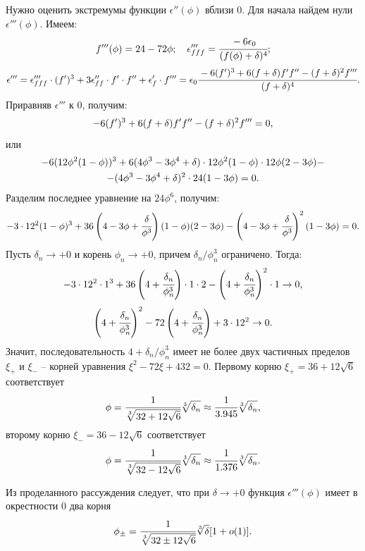 Нужно оценить экстремумы функции $\epsilon''(\phi)$ вблизи $0$. Для начала найдем нули $\epsilon'''(\phi)$. Имеем:
$$f'''(\phi) = 24 - 72 \phi; \quad \epsilon'''_{fff} = \cfrac{-6 \epsilon_0}{(f(\phi) + \delta)^4} {\text{;}}$$
\begin{equation}
    \epsilon''' = \epsilon'''_{fff} \cdot (f')^3 + 3 \epsilon''_{ff} \cdot f' \cdot f'' + \epsilon'_f \cdot f''' = \epsilon_0 \cfrac{-6 (f')^3 + 6 (f + \delta) f' f'' - (f + \delta)^2 f'''}{(f + \delta)^4} {\text{.}}
    \label{eq:epsilon_phi_phi_phi}
\end{equation}
Приравняв $\epsilon'''$ к $0$, получим:
$$-6 (f')^3 + 6 (f + \delta) f' f'' - (f + \delta)^2 f''' = 0 {\text{,}}$$
или
\begin{multline*}
    -6(12 \phi^2 (1 - \phi))^3 + 6(4 \phi^3 - 3\phi^4 + \delta) \cdot 12 \phi^2 (1 - \phi) \cdot 12 \phi (2 - 3\phi) - \\ - (4 \phi^3 - 3 \phi^4 + \delta)^2 \cdot 24 (1 - 3 \phi) = 0 {\text{.}}
\end{multline*}
Разделим последнее уравнение на $24\phi^6$, получим:
$$-3 \cdot 12^2 (1 - \phi)^3 + 36 \left(4 - 3\phi + \cfrac{\delta}{\phi^3} \right)(1 - \phi)(2 - 3\phi) - \left(4 - 3 \phi + \cfrac{\delta}{\phi^3} \right)^2 (1 - 3 \phi) = 0 {\text{.}}$$
Пусть $\delta_n \to +0$ и корень $\phi_n \to +0$, причем $\delta_n/\phi_n^3$ ограничено. Тогда:
$$-3 \cdot 12^2 \cdot 1^3 + 36 \left(4 + \cfrac{\delta_n}{\phi_n^3} \right) \cdot 1 \cdot 2 - \left(4 + \cfrac{\delta_n}{\phi_n^3} \right)^2 \cdot 1 \to 0 {\text{,}}$$
$$\left(4 + \cfrac{\delta_n}{\phi_n^3} \right)^2 - 72 \left(4 + \cfrac{\delta_n}{\phi_n^3} \right) + 3 \cdot 12^2 \to 0 {\text{.}}$$
Значит, последовательность $4 + \delta_n/\phi_n^3$ имеет не более двух частичных пределов $\xi_+$ и $\xi_-$ -- корней уравнения $\xi^2 - 72 \xi + 432 = 0$. Первому корню $\xi_+ = 36 + 12 \sqrt{6}$ соответствует
$$\phi = \cfrac{1}{\sqrt[3]{32 + 12 \sqrt{6}}} \sqrt[3]{\delta_n} \approx \cfrac{1}{3.945} \sqrt[3]{\delta_n} {\text{,}}$$
второму корню $\xi_- = 36 - 12 \sqrt{6}$ соответствует
$$\phi = \cfrac{1}{\sqrt[3]{32 - 12 \sqrt{6}}} \sqrt[3]{\delta_n} \approx \cfrac{1}{1.376} \sqrt[3]{\delta_n} {\text{.}}$$

Из проделанного рассуждения следует, что при $\delta \to +0$ функция $\epsilon'''(\phi)$ имеет в окрестности $0$ два корня
\begin{equation}
    \phi_{\pm} = \cfrac{1}{\sqrt[3]{32 \pm 12 \sqrt{6}}} \sqrt[3]{\delta} [1 + o(1)] {\text{.}}
    \label{eq:epsilon_phi_phi_phi_roots}
\end{equation}

